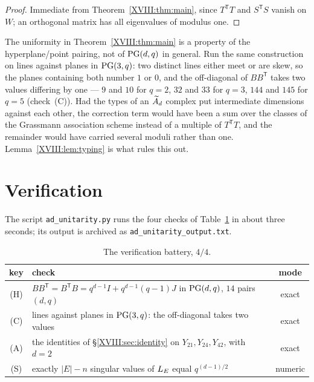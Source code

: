 \begin{proof}
Immediate from Theorem~\ref{XVIII:thm:main}, since $T^{\mathsf T}T$ and $S^{\mathsf T}S$ vanish
on $W$; an orthogonal matrix has all eigenvalues of modulus one.
\end{proof}

\begin{remark}\label{XVIII:rem:typing}
The uniformity in Theorem~\ref{XVIII:thm:main} is a property of the hyperplane/point pairing, not
of $\mathrm{PG}(d,q)$ in general. Run the same construction on lines against planes in $\mathrm{PG}(3,q)$:
two distinct lines either meet or are skew, so the planes containing both number $1$ or
$0$, and the off-diagonal of $BB^{\mathsf T}$ takes two values differing by one --- $9$ and
$10$ for $q=2$, $32$ and $33$ for $q=3$, $144$ and $145$ for $q=5$ (check~(C)). Had the
types of an $\widetilde A_{d}$ complex put intermediate dimensions against each other, the
correction term would have been a sum over the classes of the Grassmann association scheme
instead of a multiple of $T^{\mathsf T}T$, and the remainder would have carried several
moduli rather than one. Lemma~\ref{XVIII:lem:typing} is what rules this out.
\end{remark}

\section{Verification}\label{XVIII:sec:battery}

The script \texttt{ad\_unitarity.py} runs the four checks of Table~\ref{XVIII:tab:battery} in
about three seconds; its output is archived as \texttt{ad\_unitarity\_output.txt}.

\begin{table}[ht]
\centering\small
\begin{tabular}{clc}
\toprule
key & check & mode\\
\midrule
(H) & $BB^{\mathsf T}=B^{\mathsf T}B=q^{d-1}I+q^{d-1}(q-1)J$ in $\mathrm{PG}(d,q)$, $14$ pairs $(d,q)$ & exact\\
(C) & lines against planes in $\mathrm{PG}(3,q)$: the off-diagonal takes two values & exact\\
(A) & the identities of \S\ref{XVIII:sec:identity} on $Y_{21},Y_{24},Y_{42}$, with $d=2$ & exact\\
(S) & exactly $|E|-n$ singular values of $L_E$ equal $q^{(d-1)/2}$ & numeric\\
\bottomrule
\end{tabular}
\caption{The verification battery, $4/4$.}
\label{XVIII:tab:battery}
\end{table}

